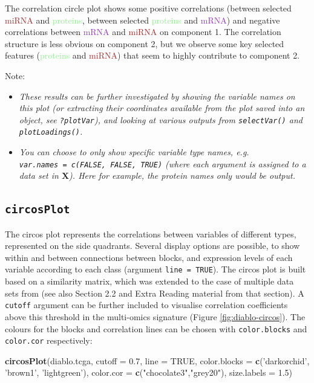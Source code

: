\documentclass[]{book}
\newenvironment{Shaded}{\begin{snugshade}}{\end{snugshade}}
\newcommand{\KeywordTok}[1]{\textcolor[rgb]{0.13,0.29,0.53}{\textbf{#1}}}
\newcommand{\DataTypeTok}[1]{\textcolor[rgb]{0.13,0.29,0.53}{#1}}
\newcommand{\FloatTok}[1]{\textcolor[rgb]{0.00,0.00,0.81}{#1}}
\newcommand{\StringTok}[1]{\textcolor[rgb]{0.31,0.60,0.02}{#1}}
\newcommand{\OtherTok}[1]{\textcolor[rgb]{0.56,0.35,0.01}{#1}}
\newcommand{\NormalTok}[1]{#1}
\begin{document}
The correlation circle plot shows some positive correlations (between
selected \textcolor{brown}{miRNA} and \textcolor{lightgreen}{proteins},
between selected \textcolor{lightgreen}{proteins} and
\textcolor{darkorchid}{mRNA}) and negative correlations between
\textcolor{darkorchid}{mRNA} and \textcolor{brown}{miRNA} on component
1. The correlation structure is less obvious on component 2, but we
observe some key selected features (\textcolor{lightgreen}{proteins} and
\textcolor{brown}{miRNA}) that seem to highly contribute to component 2.

Note:

\begin{itemize}
\item
  \emph{These results can be further investigated by showing the
  variable names on this plot (or extracting their coordinates available
  from the plot saved into an object, see \texttt{?plotVar}), and
  looking at various outputs from \texttt{selectVar()} and
  \texttt{plotLoadings()}.}
\item
  \emph{You can choose to only show specific variable type names, e.g.
  \texttt{var.names\ =\ c(FALSE,\ FALSE,\ TRUE)} (where each argument is
  assigned to a data set in \(\boldsymbol X\)). Here for example, the
  protein names only would be output.}
\end{itemize}

\subsection{\texorpdfstring{\texttt{circosPlot}}{circosPlot}}\label{circosplot}

The circos plot represents the correlations between variables of
different types, represented on the side quadrants. Several display
options are possible, to show within and between connections between
blocks, and expression levels of each variable according to each class
(argument \texttt{line\ =\ TRUE}). The circos plot is built based on a
similarity matrix, which was extended to the case of multiple data sets
from \citet{Gon12} (see also Section 2.2 and Extra Reading material from
that section). A \texttt{cutoff} argument can be further included to
visualise correlation coefficients above this threshold in the
multi-omics signature (Figure \ref{fig:diablo-circos}). The colours for
the blocks and correlation lines can be chosen with
\texttt{color.blocks} and \texttt{color.cor} respectively:

\begin{Shaded}
\begin{Highlighting}[]
\KeywordTok{circosPlot}\NormalTok{(diablo.tcga, }\DataTypeTok{cutoff =} \FloatTok{0.7}\NormalTok{, }\DataTypeTok{line =} \OtherTok{TRUE}\NormalTok{, }
           \DataTypeTok{color.blocks =} \KeywordTok{c}\NormalTok{(}\StringTok{'darkorchid'}\NormalTok{, }\StringTok{'brown1'}\NormalTok{, }\StringTok{'lightgreen'}\NormalTok{),}
           \DataTypeTok{color.cor =} \KeywordTok{c}\NormalTok{(}\StringTok{"chocolate3"}\NormalTok{,}\StringTok{"grey20"}\NormalTok{), }\DataTypeTok{size.labels =} \FloatTok{1.5}\NormalTok{)}
\end{Highlighting}
\end{Shaded}
\end{document}
